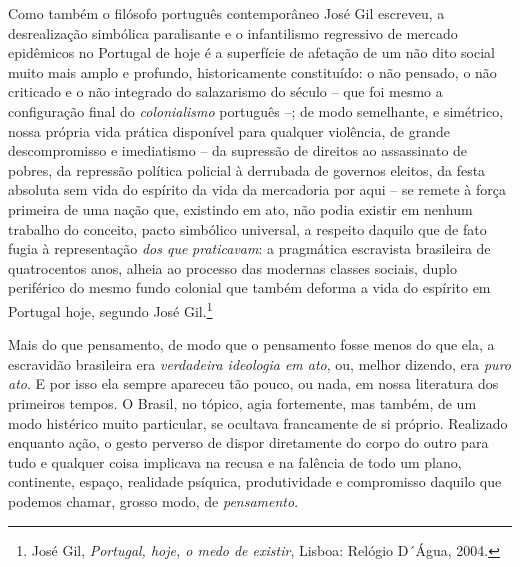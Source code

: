 Como também o filósofo português contemporâneo José Gil escreveu, a
desrealização simbólica paralisante e o infantilismo regressivo de
mercado epidêmicos no Portugal de hoje é a superfície de afetação de um
não dito social muito mais amplo e profundo, historicamente constituído:
o não pensado, o não criticado e o não integrado do salazarismo do
século  -- que foi mesmo a configuração final do \emph{colonialismo}
português --; de modo semelhante, e simétrico, nossa própria vida
prática disponível para qualquer violência, de grande descompromisso e
imediatismo -- da supressão de direitos ao assassinato de pobres, da
repressão política policial à derrubada de governos eleitos, da festa
absoluta sem vida do espírito da vida da mercadoria por aqui -- se
remete à força primeira de uma nação que, existindo em ato, não podia
existir em nenhum trabalho do conceito, pacto simbólico universal, a
respeito daquilo que de fato fugia à representação \emph{dos que}
\emph{praticavam}: a pragmática escravista brasileira de quatrocentos
anos, alheia ao processo das modernas classes sociais, duplo periférico
do mesmo fundo colonial que também deforma a vida do espírito em
Portugal hoje, segundo José Gil.\footnote{José Gil, \emph{Portugal, hoje,
  o medo de existir}, Lisboa: Relógio D´Água, 2004.}

Mais do que pensamento, de modo que o pensamento fosse menos do que ela,
a escravidão brasileira era \emph{verdadeira ideologia em ato}, ou,
melhor dizendo, era \emph{puro} \emph{ato}. E por isso ela sempre
apareceu tão pouco, ou nada, em nossa literatura dos primeiros tempos. O
Brasil, no tópico, agia fortemente, mas também, de um modo histérico
muito particular, se ocultava francamente de si próprio. Realizado
enquanto ação, o gesto perverso de dispor diretamente do corpo do outro
para tudo e qualquer coisa implicava na recusa e na falência de todo um
plano, continente, espaço, realidade psíquica, produtividade e
compromisso daquilo que podemos chamar, grosso modo, de
\emph{pensamento}.

